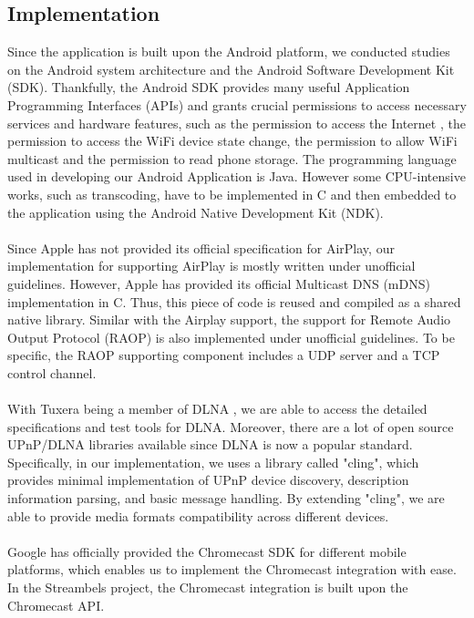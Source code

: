 \subsection{Implementation}
Since the application is built upon the Android platform, we conducted studies on the Android system architecture and the Android Software Development Kit (SDK). Thankfully, the Android SDK provides many useful Application Programming Interfaces (APIs) and grants crucial permissions to access necessary services and hardware features, such as the permission to access the Internet , the permission to access the WiFi device state change, the permission to allow WiFi multicast and  the permission to read phone storage. The programming language used in developing our Android Application is Java. However some CPU-intensive works, such as transcoding, have to be implemented in C and then embedded to the application using the Android Native Development Kit (NDK).\\
\\
Since Apple has not provided its official specification for AirPlay, our implementation for supporting AirPlay is mostly written under unofficial guidelines. However, Apple has provided its official Multicast DNS (mDNS) implementation in C. Thus, this piece of code is reused and compiled as a shared native library. Similar with the Airplay support, the support for Remote Audio Output Protocol (RAOP) is
 also implemented under unofficial guidelines. To be specific, the RAOP supporting component includes a UDP server and a TCP control channel.\\
\\
With Tuxera being a member of DLNA , we are able to access the detailed specifications and test tools for DLNA. Moreover,  there are a lot of open source UPnP/DLNA
 libraries available since DLNA is now a popular standard. Specifically, in our
 implementation, we uses a library called "cling"\cite{cling}, which provides minimal implementation of UPnP device discovery, description information parsing, and basic message handling. By extending "cling"\cite{cling}, we are able to provide media formats compatibility across different devices.\\
\\
Google has officially provided the Chromecast SDK for different mobile platforms, which enables us to  implement the Chromecast integration with ease. In the Streambels project, the Chromecast integration is built upon the Chromecast API.\\
\\
